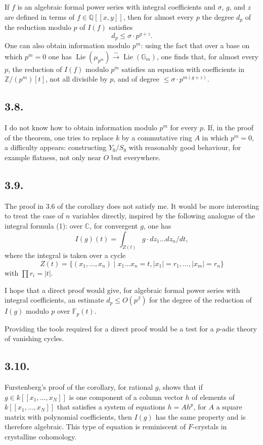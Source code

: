 \documentclass[11pt,leqno]{article}
\DeclareMathOperator{\Lie}{Lie}
\newcommand{\CC}{\mathbb C}
\newcommand{\GG}{\mathbb G}
\newcommand{\FF}{\mathbb F}
\newcommand{\ZZ}{\mathbb Z}
\newcommand{\QQ}{\mathbb Q}
\begin{document}
If $f$ is an algebraic formal power series with integral coefficients and $\sigma$, $g$, and $z$ are defined in terms of $f\in\QQ[[x,y]]$, then for almost every $p$ the degree $d_p$ of the reduction modulo $p$ of $I(f)$ satisfies
\begin{equation}
        d_p\le\sigma\cdot p^{g+z}. \tag{3.7.2}
\end{equation}
One can also obtain information modulo $p^m$: using the fact that over a base on which $p^m=0$ one has $\Lie(\mu_{p^m})\xrightarrow{\sim}\Lie(\GG_m)$, one finds that, for almost every $p$, the reduction of $I(f)$ modulo $p^m$ satisfies an equation with coefficients in $\ZZ/(p^m)[t]$, not all divisible by $p$, and of degree $\le\sigma\cdot p^{m(g+z)}$.

\subsection*{3.8.}
I do not know how to obtain information modulo $p^m$ for every $p$. If, in the proof of the theorem, one tries to replace $k$ by a commutative ring $A$ in which $p^m=0$, a difficulty appears: constructing $Y_0/S_0$ with reasonably good behaviour, for example flatness, not only near $O$ but everywhere.

\subsection*{3.9.}
The proof in 3.6 of the corollary does not satisfy me. It would be more interesting to treat the case of $n$ variables directly, inspired by the following analogue of the integral formula (1): over $\CC$, for convergent $g$, one has
\begin{equation}
        I(g)(t)=\int_{Z(t)} g\cdot dz_1\ldots dz_n/dt, \tag{1'}
\end{equation}
where the integral is taken over a cycle
\[
        Z(t)=\{(x_1,\ldots,x_n)\mid x_1\ldots x_n=t,
        |x_1|=r_1,\ldots,|x_m|=r_n\}
\]
with $\prod r_i=|t|$.

I hope that a direct proof would give, for algebraic formal power series with integral coefficients, an estimate $d_p\le O(p^\beta)$ for the degree of the reduction of $I(g)$ modulo $p$ over $\FF_p(t)$.

Providing the tools required for a direct proof would be a test for a $p$-adic theory of vanishing cycles.

\subsection*{3.10.}
Furstenberg's proof of the corollary, for rational $g$, shows that if $g\in k[[x_1,\ldots,x_N]]$ is one component of a column vector $h$
\clearpage
of elements of $k[[x_1,\ldots,x_N]]$ that satisfies a system of equations $h=Ah^p$, for $A$ a square matrix with polynomial coefficients, then $I(g)$ has the same property and is therefore algebraic. This type of equation is reminiscent of $F$-crystals in crystalline cohomology.
\end{document}
